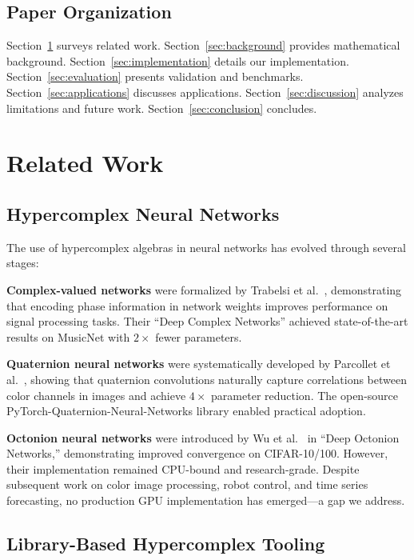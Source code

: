 \documentclass[11pt,a4paper]{article}
\begin{document}
\subsection{Paper Organization}

Section~\ref{sec:related} surveys related work. Section~\ref{sec:background} provides mathematical background. Section~\ref{sec:implementation} details our implementation. Section~\ref{sec:evaluation} presents validation and benchmarks. Section~\ref{sec:applications} discusses applications. Section~\ref{sec:discussion} analyzes limitations and future work. Section~\ref{sec:conclusion} concludes.

\section{Related Work}
\label{sec:related}

\subsection{Hypercomplex Neural Networks}

The use of hypercomplex algebras in neural networks has evolved through several stages:

\textbf{Complex-valued networks} were formalized by Trabelsi et al.~\cite{trabelsi2017}, demonstrating that encoding phase information in network weights improves performance on signal processing tasks. Their ``Deep Complex Networks'' achieved state-of-the-art results on MusicNet with $2\times$ fewer parameters.

\textbf{Quaternion neural networks} were systematically developed by Parcollet et al.~\cite{parcollet2018,parcollet2019}, showing that quaternion convolutions naturally capture correlations between color channels in images and achieve $4\times$ parameter reduction. The open-source PyTorch-Quaternion-Neural-Networks library \cite{gaudet2018} enabled practical adoption.

\textbf{Octonion neural networks} were introduced by Wu et al.~\cite{wu2020} in ``Deep Octonion Networks,'' demonstrating improved convergence on CIFAR-10/100. However, their implementation remained CPU-bound and research-grade. Despite subsequent work on color image processing, robot control, and time series forecasting, no production GPU implementation has emerged---a gap we address.

\subsection{Library-Based Hypercomplex Tooling}
\end{document}
